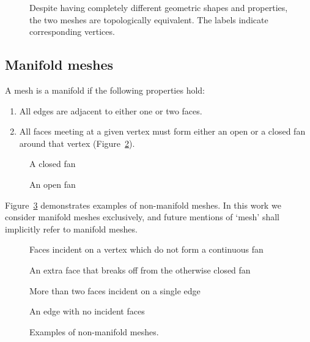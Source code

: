 \begin{figure}
    
    \caption{Despite having completely different geometric shapes and properties, the two meshes are topologically equivalent. The labels indicate corresponding vertices.}
    \label{fig:same-topology}
\end{figure}




\subsection{Manifold meshes}
A mesh is a manifold if the following properties hold:
\begin{enumerate}
\item All edges are adjacent to either one or two faces.

\item All faces meeting at a given vertex must form either an open or a closed fan around that vertex (Figure~\ref{fig:open-closed-fans}).
\end{enumerate}

\begin{figure}
    \sidebyside
        {
        \caption{A closed fan}}
        {
        \caption{An open fan}}
    \caption{}
    \label{fig:open-closed-fans}
\end{figure}

Figure~\ref{fig:non-manifolds} demonstrates examples of non-manifold meshes. In this work we consider manifold meshes exclusively, and future mentions of `mesh' shall implicitly refer to manifold meshes.

\begin{figure}
    \sidebysidefour
    {
        \caption{Faces incident on a vertex which do not form a continuous fan}}
    {
        \caption{An extra face that breaks off from the otherwise closed fan}}
    {
        \caption{More than two faces incident on a single edge}}
    {
        \caption{An edge with no incident faces}}

    \caption{Examples of non-manifold meshes.}
    \label{fig:non-manifolds}
\end{figure}





